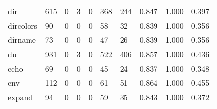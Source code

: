 \begin{longtable}{lp{2.0cm}p{2.0cm}p{2.0cm}p{2.0cm}p{2.0cm}p{2.0cm}p{2.0cm}p{2.0cm}p{2.0cm}}
dir       &                    615 &                                             0 &                                            3 &                                           0 &                                          368 &                                        244 &                                0.847 &                                  1.000 &                                0.397 \\
dircolors &                     90 &                                             0 &                                            0 &                                           0 &                                           58 &                                         32 &                                0.839 &                                  1.000 &                                0.356 \\
dirname   &                     73 &                                             0 &                                            0 &                                           0 &                                           47 &                                         26 &                                0.839 &                                  1.000 &                                0.356 \\
du        &                    931 &                                             0 &                                            3 &                                           0 &                                          522 &                                        406 &                                0.857 &                                  1.000 &                                0.436 \\
echo      &                     69 &                                             0 &                                            0 &                                           0 &                                           45 &                                         24 &                                0.837 &                                  1.000 &                                0.348 \\
env       &                    112 &                                             0 &                                            0 &                                           0 &                                           61 &                                         51 &                                0.864 &                                  1.000 &                                0.455 \\
expand    &                     94 &                                             0 &                                            0 &                                           0 &                                           59 &                                         35 &                                0.843 &                                  1.000 &                                0.372 \\

\end{longtable}

